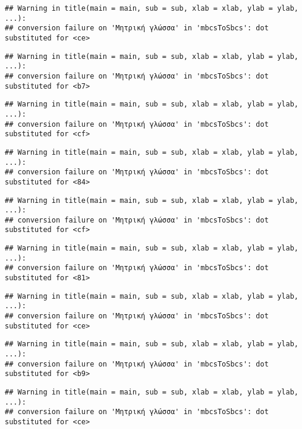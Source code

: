\documentclass[
]{article}
\begin{document}
\begin{verbatim}
## Warning in title(main = main, sub = sub, xlab = xlab, ylab = ylab, ...):
## conversion failure on 'Μητρική γλώσσα' in 'mbcsToSbcs': dot substituted for <ce>
\end{verbatim}

\begin{verbatim}
## Warning in title(main = main, sub = sub, xlab = xlab, ylab = ylab, ...):
## conversion failure on 'Μητρική γλώσσα' in 'mbcsToSbcs': dot substituted for <b7>
\end{verbatim}

\begin{verbatim}
## Warning in title(main = main, sub = sub, xlab = xlab, ylab = ylab, ...):
## conversion failure on 'Μητρική γλώσσα' in 'mbcsToSbcs': dot substituted for <cf>
\end{verbatim}

\begin{verbatim}
## Warning in title(main = main, sub = sub, xlab = xlab, ylab = ylab, ...):
## conversion failure on 'Μητρική γλώσσα' in 'mbcsToSbcs': dot substituted for <84>
\end{verbatim}

\begin{verbatim}
## Warning in title(main = main, sub = sub, xlab = xlab, ylab = ylab, ...):
## conversion failure on 'Μητρική γλώσσα' in 'mbcsToSbcs': dot substituted for <cf>
\end{verbatim}

\begin{verbatim}
## Warning in title(main = main, sub = sub, xlab = xlab, ylab = ylab, ...):
## conversion failure on 'Μητρική γλώσσα' in 'mbcsToSbcs': dot substituted for <81>
\end{verbatim}

\begin{verbatim}
## Warning in title(main = main, sub = sub, xlab = xlab, ylab = ylab, ...):
## conversion failure on 'Μητρική γλώσσα' in 'mbcsToSbcs': dot substituted for <ce>
\end{verbatim}

\begin{verbatim}
## Warning in title(main = main, sub = sub, xlab = xlab, ylab = ylab, ...):
## conversion failure on 'Μητρική γλώσσα' in 'mbcsToSbcs': dot substituted for <b9>
\end{verbatim}

\begin{verbatim}
## Warning in title(main = main, sub = sub, xlab = xlab, ylab = ylab, ...):
## conversion failure on 'Μητρική γλώσσα' in 'mbcsToSbcs': dot substituted for <ce>
\end{verbatim}
\end{document}
